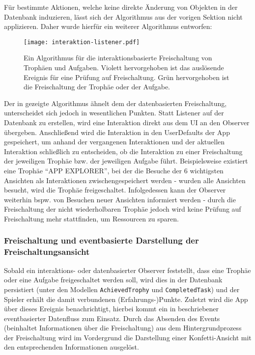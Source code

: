 Für bestimmte Aktionen, welche keine direkte Änderung von Objekten in der Datenbank induzieren, lässt sich der Algorithmus aus der vorigen Sektion nicht applizieren. Daher wurde hierfür ein weiterer Algorithmus entworfen:

\begin{figure}[H]
\texttt{[image: interaktion-listener.pdf]}
\caption{Ein Algorithmus für die interaktionsbasierte Freischaltung von Trophäen und Aufgaben. Violett hervorgehoben ist das auslösende Ereignis für eine Prüfung auf Freischaltung. Grün hervorgehoben ist die Freischaltung der Trophäe oder der Aufgabe.}\label{fig:interaktion-listener}
\end{figure}

\noindent Der in  gezeigte Algorithmus ähnelt dem der datenbasierten Freischaltung, unterscheidet sich jedoch in wesentlichen Punkten. Statt Listener auf der Datenbank zu erstellen, wird eine Interaktion direkt aus dem UI an den Observer übergeben. Anschließend wird die Interaktion in den UserDefaults der App gespeichert, um anhand der vergangenen Interaktionen und der aktuellen Interaktion schließlich zu entscheiden, ob die Interaktion zu einer Freischaltung der jeweiligen Trophäe bzw. der jeweiligen Aufgabe führt. Beispielsweise existiert eine Trophäe \enquote{APP EXPLORER}, bei der die Besuche der 6 wichtigsten Ansichten als Interaktionen zwischengespeichert werden - wurden alle Ansichten besucht, wird die Trophäe freigeschaltet. Infolgedessen kann der Observer weiterhin bspw. von Besuchen neuer Ansichten informiert werden - durch die Freischaltung der nicht wiederholbaren Trophäe jedoch wird keine Prüfung auf Freischaltung mehr stattfinden, um Ressourcen zu sparen.

\subsubsection{Freischaltung und eventbasierte Darstellung der Freischaltungsansicht}

Sobald ein interaktions- oder datenbasierter Observer feststellt, dass eine Trophäe oder eine Aufgabe freigeschaltet werden soll, wird dies in der Datenbank persistiert (unter den Modellen \texttt{AchievedTrophy} und \texttt{CompletedTask}) und der Spieler erhält die damit verbundenen (Erfahrungs-)Punkte. Zuletzt wird die App über dieses Ereignis benachrichtigt, hierbei kommt ein in  beschriebener eventbasierter Datenfluss zum Einsatz. Durch das Absenden des Events (beinhaltet Informationen über die Freischaltung) aus dem Hintergrundprozess der Freischaltung wird im Vordergrund die Darstellung einer Konfetti-Ansicht mit den entsprechenden Informationen ausgelöst.

